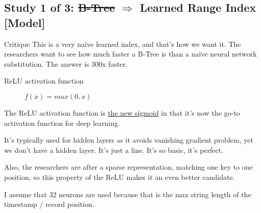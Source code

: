 \documentclass[presentation]{beamer}
\begin{document}
\subsection{Study 1 of 3: \sout{B-Tree} \(\Rightarrow\) Learned Range Index [Model]}
\label{sec:org31398a6}
\begin{frame}[label={sec:org0e944ac}]{Critique}
This is a very naïve learned index, and that's how we want it. The researchers want to see how much faster a B-Tree is than a \alert{naïve} neural network substitution. The answer is 300x faster.

\begin{description}
\item[{ReLU activation function}] \(f(x) = max(0, x)\)
\end{description}

The ReLU activation function is \uline{the new sigmoid} in that it's now the go-to activation function for deep learning.

It's typically used for hidden layers as it avoids vanishing gradient problem, yet we don't have a hidden layer. It's just a line. It's so basic, it's perfect.

Also, the researchers are after a sparse representation, matching one key to one position, so this property of the ReLU makes it an even better candidate.

I assume that 32 neurons are used because that is the max string length of the timestamp / record position.
\end{frame}
\end{document}
